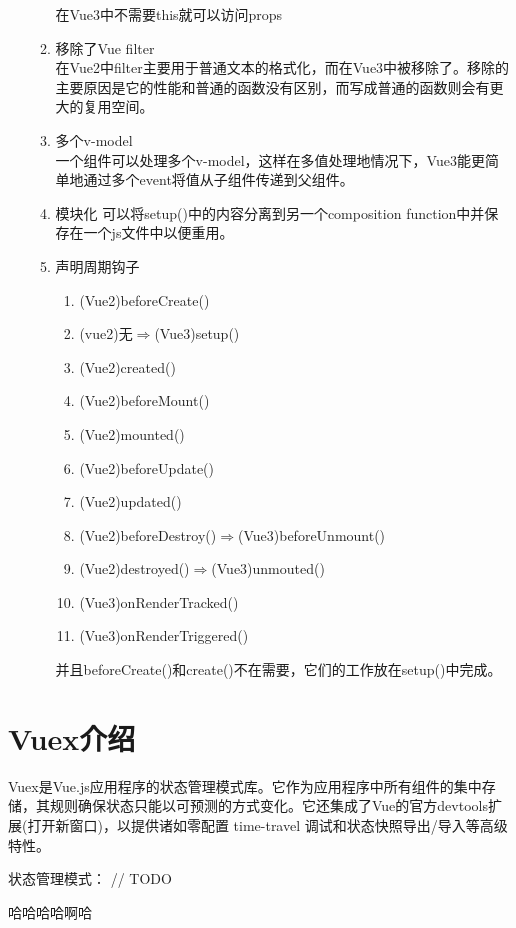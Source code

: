 \begin{enumerate}
\begin{enumerate}
                    在Vue3中不需要this就可以访问props
              \item 移除了Vue filter\\
                    在Vue2中filter主要用于普通文本的格式化，而在Vue3中被移除了。移除的主要原因是它的性能和普通的函数没有区别，而写成普通的函数则会有更大的复用空间。
              \item 多个v-model\\
                    一个组件可以处理多个v-model，这样在多值处理地情况下，Vue3能更简单地通过多个event将值从子组件传递到父组件。
              \item 模块化
                    可以将setup()中的内容分离到另一个composition function中并保存在一个js文件中以便重用。
              \item 声明周期钩子
                    \begin{enumerate}
                        \item (Vue2)beforeCreate()
                        \item (vue2)无$\Rightarrow$(Vue3)setup()
                        \item (Vue2)created()
                        \item (Vue2)beforeMount()
                        \item (Vue2)mounted()
                        \item (Vue2)beforeUpdate()
                        \item (Vue2)updated()
                        \item (Vue2)beforeDestroy()$\Rightarrow$(Vue3)beforeUnmount()
                        \item (Vue2)destroyed()$\Rightarrow$(Vue3)unmouted()
                        \item (Vue3)onRenderTracked()
                        \item (Vue3)onRenderTriggered()
                    \end{enumerate}
                    并且beforeCreate()和create()不在需要，它们的工作放在setup()中完成。
          \end{enumerate}
\end{enumerate}

\section{Vuex介绍}

Vuex是Vue.js应用程序的状态管理模式库。它作为应用程序中所有组件的集中存储，其规则确保状态只能以可预测的方式变化。它还集成了Vue的官方devtools扩展(打开新窗口)，以提供诸如零配置 time-travel 调试和状态快照导出/导入等高级特性。

状态管理模式：
// TODO

哈哈哈哈啊哈